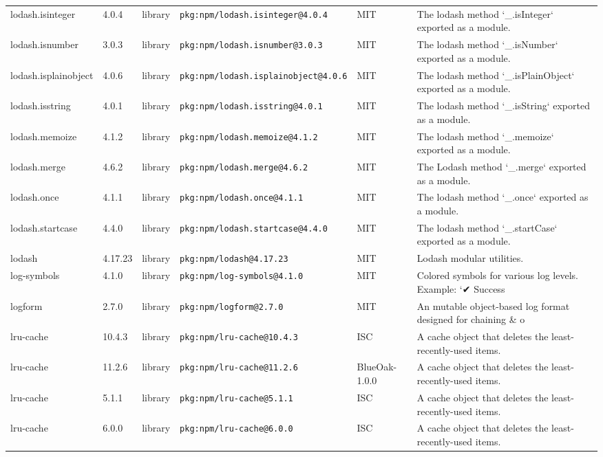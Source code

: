 \documentclass[11pt]{article}
\begin{document}
\begin{longtable}{|l|l|l|p{2.2cm}|l|p{4cm}|}
lodash.isinteger & 4.0.4 & library & \texttt{pkg:npm/lodash.isinteger@4.0.4} & MIT & The lodash method `\_.isInteger` exported as a module. \\
lodash.isnumber & 3.0.3 & library & \texttt{pkg:npm/lodash.isnumber@3.0.3} & MIT & The lodash method `\_.isNumber` exported as a module. \\
lodash.isplainobject & 4.0.6 & library & \texttt{pkg:npm/lodash.isplainobject@4.0.6} & MIT & The lodash method `\_.isPlainObject` exported as a module. \\
lodash.isstring & 4.0.1 & library & \texttt{pkg:npm/lodash.isstring@4.0.1} & MIT & The lodash method `\_.isString` exported as a module. \\
lodash.memoize & 4.1.2 & library & \texttt{pkg:npm/lodash.memoize@4.1.2} & MIT & The lodash method `\_.memoize` exported as a module. \\
lodash.merge & 4.6.2 & library & \texttt{pkg:npm/lodash.merge@4.6.2} & MIT & The Lodash method `\_.merge` exported as a module. \\
lodash.once & 4.1.1 & library & \texttt{pkg:npm/lodash.once@4.1.1} & MIT & The lodash method `\_.once` exported as a module. \\
lodash.startcase & 4.4.0 & library & \texttt{pkg:npm/lodash.startcase@4.4.0} & MIT & The lodash method `\_.startCase` exported as a module. \\
lodash & 4.17.23 & library & \texttt{pkg:npm/lodash@4.17.23} & MIT & Lodash modular utilities. \\
log-symbols & 4.1.0 & library & \texttt{pkg:npm/log-symbols@4.1.0} & MIT & Colored symbols for various log levels. Example: `✔︎ Success \\
logform & 2.7.0 & library & \texttt{pkg:npm/logform@2.7.0} & MIT & An mutable object-based log format designed for chaining \& o \\
lru-cache & 10.4.3 & library & \texttt{pkg:npm/lru-cache@10.4.3} & ISC & A cache object that deletes the least-recently-used items. \\
lru-cache & 11.2.6 & library & \texttt{pkg:npm/lru-cache@11.2.6} & BlueOak-1.0.0 & A cache object that deletes the least-recently-used items. \\
lru-cache & 5.1.1 & library & \texttt{pkg:npm/lru-cache@5.1.1} & ISC & A cache object that deletes the least-recently-used items. \\
lru-cache & 6.0.0 & library & \texttt{pkg:npm/lru-cache@6.0.0} & ISC & A cache object that deletes the least-recently-used items. \\

\end{longtable}
\end{document}
